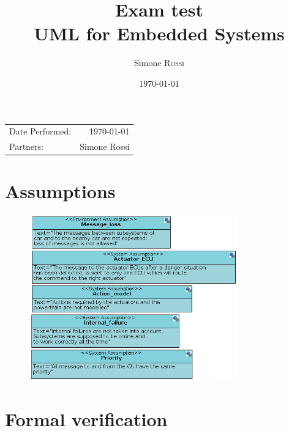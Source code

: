 \documentclass{article}
\title{Exam test\\UML for Embedded Systems} %
\author{Simone \textsc{Rossi}} %
\date{\today} %
\begin{document}
\maketitle %

\begin{center}
\begin{tabular}{l r}
Date Performed: & \today \\ %
Partners: & Simone Rossi \\ %
\end{tabular}
\end{center}



\section{Assumptions}
\begin{figure}[h!]
  \centering
  \includegraphics[width = 0.8\textwidth]{./assumptions.png}
\end{figure}

\section{Formal verification}
\end{document}
